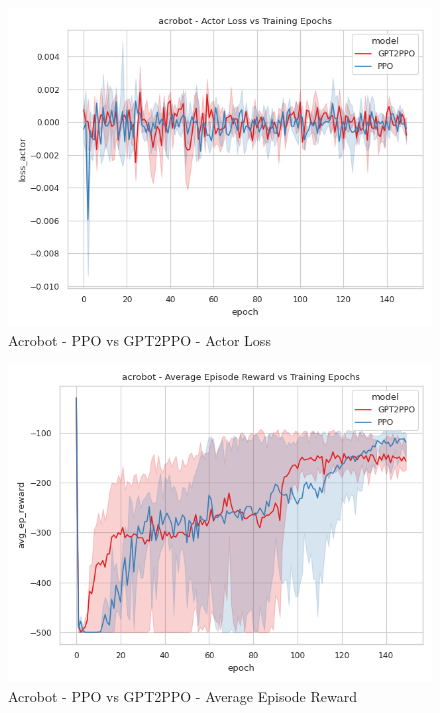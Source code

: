 \documentclass[conference]{IEEEtran}
\begin{document}
\begin{figure}[htbp]
    \centerline{\includegraphics[width=\columnwidth]{./img/acrobot-loss_actor-model.png}}
    \caption{Acrobot - PPO vs GPT2PPO - Actor Loss}
    \label{acrobot-loss_actor-model}
\end{figure}

\begin{figure}[htbp]
    \centerline{\includegraphics[width=\columnwidth]{./img/acrobot-avg_ep_reward-model.png}}
    \caption{Acrobot - PPO vs GPT2PPO - Average Episode Reward}
    \label{acrobot-avg_ep_reward-model}
\end{figure}

\end{document}
